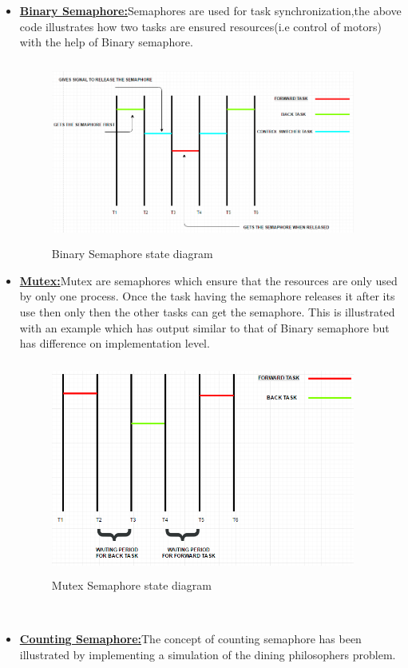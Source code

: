 \documentclass[a4paper,12pt,oneside]{book}
\begin{document}
\begin{itemize}
\item \textbf{\href{https://github.com/eYSIP-2016/RTOS_LPC2148/tree/master/Semaphore_Binary}
{Binary Semaphore:}}Semaphores are used for task synchronization,the above code illustrates how two tasks are ensured resources(i.e control of motors) with the help of Binary semaphore.
\begin{figure}[h]
\centering
\includegraphics[width=10cm,height=6cm]{Binary.PNG}
\caption{Binary Semaphore state diagram}
\end{figure}
\newpage
\item \textbf{\href{https://github.com/eYSIP-2016/RTOS_LPC2148/tree/master/Semaphore_mutex}{Mutex:}}Mutex are semaphores which ensure that the resources are only used by only one process. Once the task having the semaphore releases it after its use then only then the other tasks can get the semaphore. This is illustrated with an example which has output similar to that of Binary semaphore but has difference on implementation level.
\begin{figure}[h]
\centering
\includegraphics[width=10cm,height=7cm]{Mutex.PNG}
\caption{Mutex Semaphore state diagram}
\end{figure}

\\
\item \textbf{\href{https://github.com/eYSIP-2016/RTOS_LPC2148/tree/master/Semaphore_counting}{Counting Semaphore:}}The concept of counting semaphore has been illustrated by implementing a simulation of the dining philosophers problem.





\end{itemize}
\end{document}
